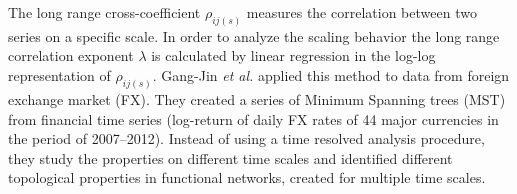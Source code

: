 \documentclass[a4paper,10pt]{scrbook}
\begin{document}





The long range cross-coefficient $\rho_{ij(s)}$ measures the correlation between two series on a specific scale. In order to analyze the scaling behavior the long range correlation exponent $\lambda$ is calculated by linear regression in the log-log representation of $\rho_{ij(s)}$. Gang-Jin \textit{et al.}  \cite{GangJin2013} applied this method to data from foreign exchange market (FX). They created a series of Minimum Spanning trees (MST) from financial time series (log-return of daily FX rates of 44 major currencies in the period of 2007–2012). Instead of using a time resolved analysis procedure, they study the properties on different time scales and identified different topological properties in functional networks, created for multiple time scales.
\end{document}
